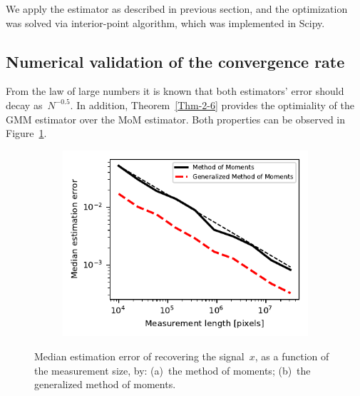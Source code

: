 \documentclass{article}
\newcommand{\asafc}[1]{{\color{blue}{[Asaf: #1]}}}
\begin{document}
We apply the estimator as described in previous section, and the optimization was solved via interior-point algorithm, which was implemented in Scipy.\asafc{I didn't make sure if those are the setting and just put the structure itself}


\subsection{Numerical validation of the convergence rate}
\label{subsec:exp_size}
From the law of large numbers it is known that both estimators' error should decay as~$N^{-0.5}$. In addition, Theorem~\ref{Thm-2-6} provides the optimiality of the GMM estimator over the MoM estimator. Both properties can be observed in Figure~\ref{fig:err_size_experiment}.

\begin{figure}[!tb]
	\begin{subfigure}[ht]{\columnwidth}
		\centering
		\includegraphics[width=\columnwidth]{figures/experiment_size_err.pdf}
	\end{subfigure}
	\caption{Median estimation error of recovering the signal~$x$, as a function of the measurement size, by: (a)~the method of moments; (b)~the generalized method of moments.}
\label{fig:err_size_experiment}
\end{figure}
\end{document}
